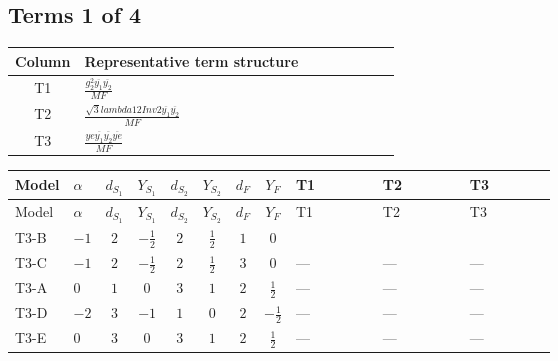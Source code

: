 \documentclass[8pt]{article}
\begin{document}
\begin{landscape}
\subsection*{Terms 1 of 4}
\begin{center}
\begin{tabular}{@{}c >{\raggedright\arraybackslash}p{0.82\linewidth}@{}}
\toprule
Column & Representative term structure \\
\midrule
T1 & \(\displaystyle \frac{g_{2}^{2} \overline{y_{1}} \overline{y_{2}}}{MF}\) \\
\midrule
T2 & \(\displaystyle \frac{\sqrt{3} lambda12Inv2 \overline{y_{1}} \overline{y_{2}}}{MF}\) \\
\midrule
T3 & \(\displaystyle \frac{ye \overline{y_{1}} \overline{y_{2}} \overline{ye}}{MF}\) \\
\midrule
\bottomrule
\end{tabular}
\end{center}
\smallskip
\tiny
\begin{longtable}{@{}llcccccc >{\raggedright\arraybackslash}p{0.21\linewidth} >{\raggedright\arraybackslash}p{0.21\linewidth} >{\raggedright\arraybackslash}p{0.21\linewidth}@{}}
\toprule
Model & $\alpha$ & $d_{S_1}$ & $Y_{S_1}$ & $d_{S_2}$ & $Y_{S_2}$ & $d_F$ & $Y_F$ & T1 & T2 & T3 \\
\midrule
\endfirsthead
\toprule
Model & $\alpha$ & $d_{S_1}$ & $Y_{S_1}$ & $d_{S_2}$ & $Y_{S_2}$ & $d_F$ & $Y_F$ & T1 & T2 & T3 \\
\midrule
\endhead
T3-B & $-1$ & $2$ & $-\frac{1}{2}$ & $2$ & $\frac{1}{2}$ & $1$ & $0$ & \scriptsize\adjustbox{max width=\linewidth}{$\begin{gathered} - \frac{3 g_{2}^{2} \overline{y_{1}} \overline{y_{2}}}{8 MF}\end{gathered}$} & \scriptsize\adjustbox{max width=\linewidth}{$\begin{gathered} - \frac{\sqrt{3} lambda12Inv2 \overline{y_{1}} \overline{y_{2}}}{6 MF}\end{gathered}$} & \scriptsize\adjustbox{max width=\linewidth}{$\begin{gathered} \frac{ye \overline{y_{1}} \overline{y_{2}} \overline{ye}}{8 MF}\end{gathered}$} \\
\midrule
T3-C & $-1$ & $2$ & $-\frac{1}{2}$ & $2$ & $\frac{1}{2}$ & $3$ & $0$ & --- & --- & --- \\
\midrule
T3-A & $0$ & $1$ & $0$ & $3$ & $1$ & $2$ & $\frac{1}{2}$ & --- & --- & --- \\
\midrule
T3-D & $-2$ & $3$ & $-1$ & $1$ & $0$ & $2$ & $-\frac{1}{2}$ & --- & --- & --- \\
\midrule
T3-E & $0$ & $3$ & $0$ & $3$ & $1$ & $2$ & $\frac{1}{2}$ & --- & --- & --- \\
\midrule
\bottomrule
\end{longtable}
\clearpage

\end{landscape}
\end{document}
